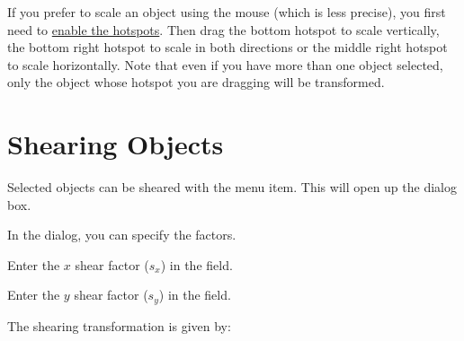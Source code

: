 If you prefer to scale an \gls{object} using the mouse (which is
less precise), you first need to \hyperref[mi:hotspots]{enable the
hotspots}. Then drag the bottom  hotspot to scale
vertically, the bottom right hotspot to scale in both directions or
the middle right hotspot to scale horizontally. Note that even if
you have more than one object selected, only the object whose
hotspot you are dragging will be transformed.




\section{Shearing Objects}\label{sec:shearobjects}


Selected \glspl{object} can be sheared with
the  menu item. This will open up the
 dialog box.


In the  dialog, you can specify the
 factors.

Enter the $x$ shear factor ($s_x$) in the  field.

Enter the $y$ shear factor ($s_y$) in the  field.

The shearing transformation is given by:
\TeXParserLibToImage
[div=displaymath,alt={
 (
   [ 1 , sX ]
   [ sY , 1 ]
 )
 (
   [ x ]
   [ y ]
 )
=
 (
   [ x + sX \texttimes\ y ]
   [ y + sY \texttimes\ x ]
 )
}]
{
\[
  \left(
  \begin{array}{cc}
  1 & s_x\\
  s_y & 1
  \end{array}
  \right)
  \left(
  \begin{array}{c}
  x\\
  y
  \end{array}
  \right)
  =
  \left(
  \begin{array}{l}
  x + s_x y\\
  y + s_y x
  \end{array}
  \right)
  \]
}

